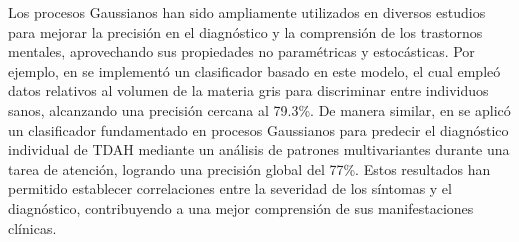 Los procesos Gaussianos han sido ampliamente utilizados en diversos estudios para mejorar la precisión en el diagnóstico y la comprensión de los trastornos mentales, aprovechando sus propiedades no paramétricas y estocásticas. Por ejemplo, en \cite{Lim2013} se implementó un clasificador basado en este modelo, el cual empleó datos relativos al volumen de la materia gris para discriminar entre individuos sanos, alcanzando una precisión cercana al 79.3\%. De manera similar, en \cite{Hart20143083} se aplicó un clasificador fundamentado en procesos Gaussianos para predecir el diagnóstico individual de TDAH mediante un análisis de patrones multivariantes durante una tarea de atención, logrando una precisión global del 77\%. Estos resultados han permitido establecer correlaciones entre la severidad de los síntomas y el diagnóstico, contribuyendo a una mejor comprensión de sus manifestaciones clínicas.